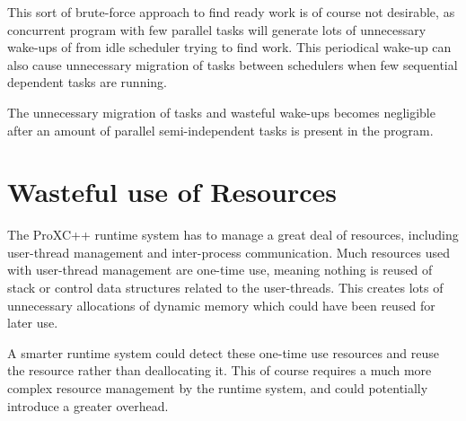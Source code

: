 This sort of brute\hyp{}force approach to find ready work is of course not desirable, as concurrent program with few parallel tasks will generate lots of unnecessary wake\hyp{}ups of from idle scheduler trying to find work. This periodical wake\hyp{}up can also cause unnecessary migration of tasks between schedulers when few sequential dependent tasks are running. 

The unnecessary migration of tasks and wasteful wake\hyp{}ups becomes negligible after an amount of parallel semi\hyp{}independent tasks is present in the program.


\section{Wasteful use of Resources}

The ProXC++ runtime system has to manage a great deal of resources, including user\hyp{}thread management and inter\hyp{}process communication. Much resources used with user\hyp{}thread management are one\hyp{}time use, meaning nothing is reused of stack or control data structures related to the user\hyp{}threads. This creates lots of unnecessary allocations of dynamic memory which could have been reused for later use.

A smarter runtime system could detect these one\hyp{}time use resources and reuse the resource rather than deallocating it. This of course requires a much more complex resource management by the runtime system, and could potentially introduce a greater overhead.




